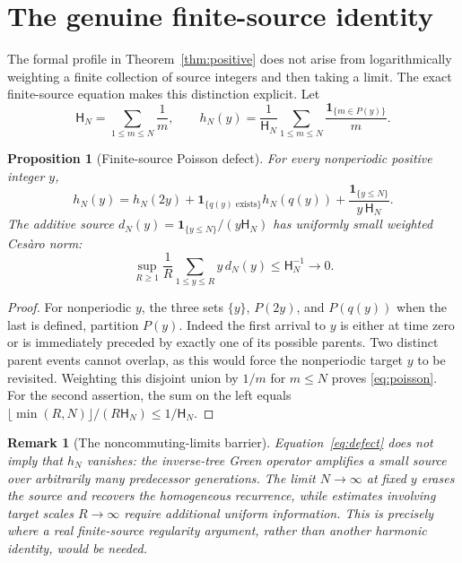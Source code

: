 \documentclass[11pt,a4paper]{article}
\newtheorem{remark}[theorem]{Remark}
\newtheorem{proposition}[theorem]{Proposition}
\newcommand{\ind}{\mathbf 1}
\begin{document}
\section{The genuine finite-source identity}
The formal profile in Theorem~\ref{thm:positive} does not arise
from logarithmically weighting a finite collection of source
integers and then taking a limit. The exact finite-source equation
makes this distinction explicit.
Let
\[
 \mathsf H_N=\sum_{1\le m\le N}\frac1m,\qquad
 h_N(y)=\frac1{\mathsf H_N}\sum_{1\le m\le N}
 \frac{\ind_{\{m\in P(y)\}}}{m}.
\]
\begin{proposition}[Finite-source Poisson defect]\label{prop:source}
For every nonperiodic positive integer $y$,
\begin{equation}\label{eq:poisson}
 \boxed{\quad h_N(y)=h_N(2y)+
 \ind_{\{q(y)\text{ exists}\}}h_N(q(y))
 +\frac{\ind_{\{y\le N\}}}{y\,\mathsf H_N}.\quad}
\end{equation}
The additive source $d_N(y)=\ind_{\{y\le N\}}/(y\mathsf H_N)$
has uniformly small weighted Ces\`aro norm:
\begin{equation}\label{eq:defect}
 \sup_{R\ge1}\frac1R\sum_{1\le y\le R}y\,d_N(y)
 \le\mathsf H_N^{-1}\longrightarrow0.
\end{equation}
\end{proposition}
\begin{proof}
For nonperiodic $y$, the three sets $\{y\}$, $P(2y)$,
and $P(q(y))$ when the last is defined, partition $P(y)$.
Indeed the first arrival to $y$ is either at time zero or is
immediately preceded by exactly one of its possible parents.
Two distinct parent events cannot overlap, as this would force
the nonperiodic target $y$ to be revisited. Weighting this disjoint
union by $1/m$ for $m\le N$ proves \eqref{eq:poisson}.
For the second assertion, the sum on the left equals
$\lfloor\min(R,N)\rfloor/(R\mathsf H_N)\le1/\mathsf H_N$.
\end{proof}
\begin{remark}[The noncommuting-limits barrier]
Equation~\eqref{eq:defect} does \emph{not} imply that $h_N$
vanishes: the inverse-tree Green operator amplifies a small
source over arbitrarily many predecessor generations. The limit
$N\to\infty$ at fixed $y$ erases the source and recovers the
homogeneous recurrence, while estimates involving target scales
$R\to\infty$ require additional uniform information. This is
precisely where a real finite-source regularity argument, rather
than another harmonic identity, would be needed.
\end{remark}
\end{document}
